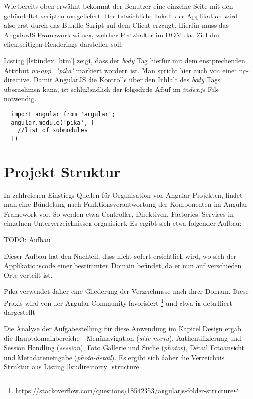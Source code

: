 Wie bereits oben erwähnt bekommt der Benutzer eine einzelne Seite mit den gebündeltet scripten ausgeliefert. Der tatsächliche Inhalt der Applikation wird also erst durch das Bundle Skript auf dem Client erzeugt. Hierfür muss das AngularJS Framework wissen, welcher Platzhalter im DOM das Ziel des clientseitigen Renderings darstellen soll.  

Listing \ref{lst:index_html} zeigt, dass der \textit{body} Tag hierfür mit dem enstprechenden Attribut \textit{ng-app="pika"} markiert wordern ist. Man spricht hier auch von einer \gls{ng-directive}. Damit AngularJS die Kontrolle über den Inhlalt des \textit{body} Tags übernehmen kann, ist schlußendlich der folgednde Afruf im \textit{index.js} File notwendig. 

\begin{listing}[H]
\begin{verbatim}
  import angular from 'angular';
  angular.module('pika', [ 
    //list of submodules 
  ])
\end{verbatim}
\end{listing}


\section{Projekt Struktur}

In zahlreichen Einstiegs Quellen für Organisation von Angular Projekten, findet man eine Bündelung nach Funktionsverantwortung der Komponenten im Angular Framework vor. So werden etwa Controller, Direktiven, Factories, Services in einzelnen Unterverzeichnissen organisiert. Es ergibt sich etwa folgender Aufbau:

TODO: Aufbau

Dieser Aufbau hat den Nachteil, dass nicht sofort ersichtlich wird, wo sich der Applikationscode einer bestimmten Domain befindet, da er nun auf verschieden Orte verteilt ist. 

Pika verwendet daher eine Gliederung der Verzeichnisse nach ihrer Domain. Diese Praxis wird von der Angular Community favorisiert \footnote{https://stackoverflow.com/questions/18542353/angularjs-folder-structure} und etwa in \cite{Kukic:2014} detailliert dargestellt.

Die Analyse der Aufgabestellung für diese Anwendung im Kapitel Design ergab die Hauptdomainbereiche - Menünavigation (\textit{side-menu}), Authentifizierung und Session Handling (\textit{session}), Foto Gallerie und Suche (\textit{photos}), Detail Fotoansicht und Metadateneingabe (\textit{photo-detail}).
Es ergibt sich daher die Verzeichnis Struktur aus Listing \ref{lst:directorty_structure}.

